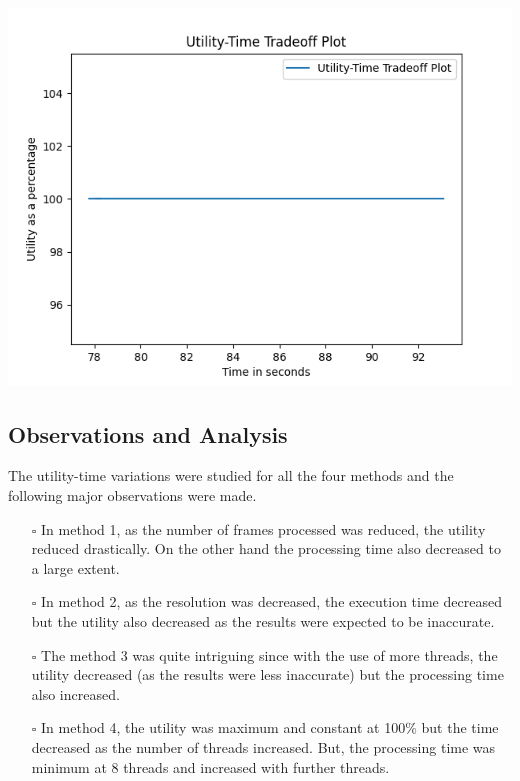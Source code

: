 \documentclass{article} %
\begin{document}
\begin{center}
    \\\includegraphics[scale = 0.9]{out_images/method_4_utility.png}
\end{center}

\subsection{Observations and Analysis}
The utility-time variations were studied for all the four methods and the following major observations were made.

\begin{itemize}
    \item[$\square$] In method 1, as the number of frames processed was reduced, the utility reduced drastically. On the other hand the processing time also decreased to a large extent.
    \item[$\square$] In method 2, as the resolution was decreased, the execution time decreased but the utility also decreased as the results were expected to be inaccurate.
    \item[$\square$] The method 3 was quite intriguing since with the use of more threads, the utility decreased (as the results were less inaccurate) but the processing time also increased.
    \item[$\square$] In method 4, the utility was maximum and constant at 100\% but the time decreased as the number of threads increased. But, the processing time was minimum at 8 threads and increased with further threads.
\end{itemize}
\end{document}
